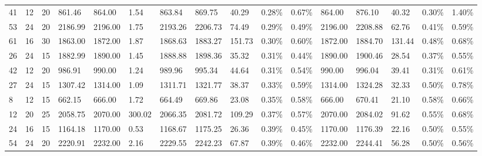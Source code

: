 \documentclass[../main]{subfiles}
\begin{document}
\begin{longtable}{l|ll|lll|lllll|lllll}
   41 & 12                         & 20                         & 861.46                    & 864.00      & 1.54                & 863.84  & 869.75  & 40.29  & 0.28\%  & 0.67\% & 864.00  & 876.10  & 40.32  & 0.30\%  & 1.40\% \\
   53 & 24                         & 20                         & 2186.99                   & 2196.00     & 1.75                & 2193.26 & 2206.73 & 74.49  & 0.29\%  & 0.49\% & 2196.00 & 2208.88 & 62.76  & 0.41\%  & 0.59\% \\
   61 & 16                         & 30                         & 1863.00                   & 1872.00     & 1.87                & 1868.63 & 1883.27 & 151.73 & 0.30\%  & 0.60\% & 1872.00 & 1884.70 & 131.44 & 0.48\%  & 0.68\% \\
   26 & 24                         & 15                         & 1882.99                   & 1890.00     & 1.45                & 1888.88 & 1898.36 & 35.32  & 0.31\%  & 0.44\% & 1890.00 & 1900.46 & 28.54  & 0.37\%  & 0.55\% \\
   42 & 12                         & 20                         & 986.91                    & 990.00      & 1.24                & 989.96  & 995.34  & 44.64  & 0.31\%  & 0.54\% & 990.00  & 996.04  & 39.41  & 0.31\%  & 0.61\% \\
   27 & 24                         & 15                         & 1307.42                   & 1314.00     & 1.09                & 1311.71 & 1321.77 & 38.37  & 0.33\%  & 0.59\% & 1314.00 & 1324.28 & 32.33  & 0.50\%  & 0.78\% \\
   8  & 12                         & 15                         & 662.15                    & 666.00      & 1.72                & 664.49  & 669.86  & 23.08  & 0.35\%  & 0.58\% & 666.00  & 670.41  & 21.10  & 0.58\%  & 0.66\% \\
   12 & 20                         & 25                         & 2058.75                   & 2070.00     & 300.02              & 2066.35 & 2081.72 & 109.29 & 0.37\%  & 0.57\% & 2070.00 & 2084.02 & 91.62  & 0.55\%  & 0.68\% \\
   24 & 16                         & 15                         & 1164.18                   & 1170.00     & 0.53                & 1168.67 & 1175.25 & 26.36  & 0.39\%  & 0.45\% & 1170.00 & 1176.39 & 22.16  & 0.50\%  & 0.55\% \\
   54 & 24                         & 20                         & 2220.91                   & 2232.00     & 2.16                & 2229.55 & 2242.23 & 67.87  & 0.39\%  & 0.46\% & 2232.00 & 2244.41 & 56.28  & 0.50\%  & 0.56\% \\

\end{longtable}
\end{document}
